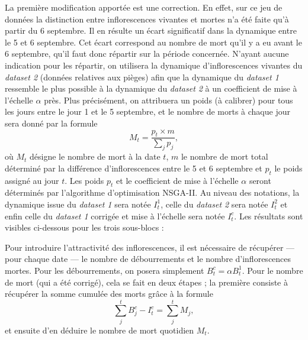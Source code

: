 \documentclass[a4paper, 11pt]{article}
\begin{document}
La première modification apportée est une correction. En effet, sur ce jeu de données la distinction entre inflorescences vivantes et mortes n'a été faite qu'à partir du 6 septembre. Il en résulte un écart significatif dans la dynamique entre le 5 et 6 septembre. Cet écart correspond au nombre de mort qu'il y a eu avant le 6 septembre, qu'il faut donc répartir sur la période concernée. N'ayant aucune indication pour les répartir, on utilisera la dynamique d'inflorescences vivantes du \textit{dataset 2} (données relatives aux pièges) afin que la dynamique du \textit{dataset 1} ressemble le plus possible à la dynamique du \textit{dataset 2} à un coefficient de mise à l'échelle $\alpha$ près. Plus précisément, on attribuera un poids (à calibrer) pour tous les jours entre le jour 1 et le 5 septembre, et
le nombre de morts à chaque jour sera donné par la formule
$$M_t = \frac{p_t \times m}{\sum_j p_j},$$
où $M_t$ désigne le nombre de mort à la date $t$, $m$ le nombre de mort total déterminé par la différence d’inflorescences entre le 5 et 6 septembre et $p_t$ le poids assigné au jour $t$. Les poids $p_t$ et le coefficient de mise à l'échelle $\alpha$ seront déterminés par l'algorithme d'optimisation NSGA-II. Au niveau des notations, la dynamique issue du \textit{dataset 1} sera notée $I_t^1$, celle du \textit{dataset 2} sera notée $I_t^2$ et enfin celle du \textit{dataset 1} corrigée et mise à l'échelle sera notée $I_t^c$. Les résultats sont visibles ci-dessous pour les trois sous-blocs :

\begin{figure}[h]
 \centering
\end{figure}
 
\begin{figure}[h]
 \centering
\end{figure}

\begin{figure}[h]
 \centering
\end{figure}

\clearpage

Pour introduire l'attractivité des inflorescences, il est nécessaire de récupérer --- pour chaque date --- le nombre de débourrements et le nombre d'inflorescences mortes. Pour les débourrements, on posera simplement $B_t^c = \alpha B_t^1$. Pour le nombre de mort (qui a été corrigé), cela se fait en deux étapes ; la première consiste à récupérer la somme cumulée des morts grâce à la formule
$$\sum_j^t B_j^c - I_t^c = \sum_j^t M_j,$$
et ensuite d'en déduire le nombre de mort quotidien $M_t$.
\end{document}
